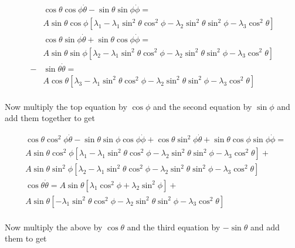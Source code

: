 \documentclass[extra,mreferee]{gji}
\begin{document}
\begin{equation}
\begin{aligned}
 & \cos{\theta}\cos{\phi} \dot{\theta}  - \sin{\theta}\sin{\phi} \dot{\phi} = \\
  &A \sin{\theta}\cos{\phi}\left[ \lambda_1 - \lambda_1 \sin^2{\theta}\cos^2{\phi} - \lambda_2 \sin^2{\theta}\sin^2{\phi} - \lambda_3 \cos^2{\theta} \right] \\
 &\cos{\theta}\sin{\phi} \dot{\theta}  + \sin{\theta}\cos{\phi} \dot{\phi} = \\
  &A \sin{\theta}\sin{\phi} \left[ \lambda_2 - \lambda_1 \sin^2{\theta}\cos^2{\phi} - \lambda_2 \sin^2{\theta}\sin^2{\phi} - \lambda_3 \cos^2{\theta} \right] \\
 - &\sin{\theta} \dot{\theta} = \\
  &A \cos{\theta} \left[ \lambda_3 - \lambda_1 \sin^2{\theta}\cos^2{\phi} - \lambda_2 \sin^2{\theta}\sin^2{\phi} - \lambda_3 \cos^2{\theta} \right] \\
\end{aligned}
\end{equation}

Now multiply the top equation by $\cos{\phi}$ and the second equation by $\sin{\phi}$ and add them together to get

\begin{equation}
\begin{aligned}
 & \cos{\theta}\cos^2{\phi} \dot{\theta}  - \sin{\theta}\sin{\phi} \cos{\phi} \dot{\phi} + \cos{\theta}\sin^2{\phi} \dot{\theta}  + \sin{\theta}\cos{\phi} \sin{\phi} \dot{\phi} = \\
  &A \sin{\theta}\cos^2{\phi}\left[ \lambda_1 - \lambda_1 \sin^2{\theta}\cos^2{\phi} - \lambda_2 \sin^2{\theta}\sin^2{\phi} - \lambda_3 \cos^2{\theta} \right] + \\
  &A \sin{\theta}\sin^2{\phi} \left[ \lambda_2 - \lambda_1 \sin^2{\theta}\cos^2{\phi} - \lambda_2 \sin^2{\theta}\sin^2{\phi} - \lambda_3 \cos^2{\theta} \right] \\
 & \cos{\theta}\dot{\theta} =  
   A \sin{\theta} \left[ \lambda_1 \cos^2{\phi} +  \lambda_2 \sin^2{\phi} \right] + \\
  &A \sin{\theta} \left[ - \lambda_1 \sin^2{\theta}\cos^2{\phi} - \lambda_2 \sin^2{\theta}\sin^2{\phi} - \lambda_3 \cos^2{\theta} \right] \\
\end{aligned}
\end{equation}

Now multiply the above by $\cos{\theta}$ and the third equation by $-\sin{\theta}$ and add them to get
\end{document}
